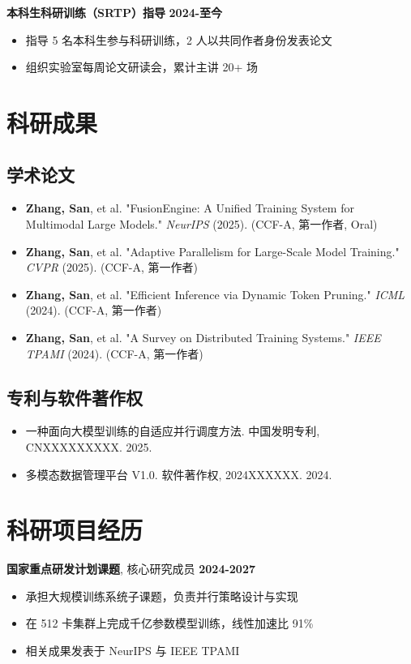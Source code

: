 \vspace{0.5em}
{\large{\textbf{本科生科研训练（SRTP）指导}}} \hfill \textbf{2024-至今}
\begin{itemize}
    \item 指导 5 名本科生参与科研训练，2 人以共同作者身份发表论文
    \item 组织实验室每周论文研读会，累计主讲 20+ 场
\end{itemize}

\section{\makebox[\widthof{\faBook}][c]{\color{USTB_Blue}{\faBook}}\quad 科研成果}
\vspace{0.3em}
\subsection{学术论文}
\begin{itemize}
    \item \textbf{Zhang, San}, et al. "FusionEngine: A Unified Training System for Multimodal Large Models." \textit{NeurIPS} (2025). (CCF-A, 第一作者, Oral)
    \item \textbf{Zhang, San}, et al. "Adaptive Parallelism for Large-Scale Model Training." \textit{CVPR} (2025). (CCF-A, 第一作者)
    \item \textbf{Zhang, San}, et al. "Efficient Inference via Dynamic Token Pruning." \textit{ICML} (2024). (CCF-A, 第一作者)
    \item \textbf{Zhang, San}, et al. "A Survey on Distributed Training Systems." \textit{IEEE TPAMI} (2024). (CCF-A, 第一作者)
\end{itemize}

\subsection{专利与软件著作权}
\begin{itemize}
    \item 一种面向大模型训练的自适应并行调度方法. 中国发明专利, CNXXXXXXXXX. 2025.
    \item 多模态数据管理平台 V1.0. 软件著作权, 2024XXXXXX. 2024.
\end{itemize}

\section{\makebox[\widthof{\faFlask}][c]{\color{USTB_Blue}{\faFlask}}\quad 科研项目经历}
\vspace{0.3em}
{\large{\textbf{国家重点研发计划课题}, 核心研究成员}} \hfill \textbf{2024-2027}
\begin{itemize}
    \item 承担大规模训练系统子课题，负责并行策略设计与实现
    \item 在 512 卡集群上完成千亿参数模型训练，线性加速比 91\%
    \item 相关成果发表于 NeurIPS 与 IEEE TPAMI
\end{itemize}

